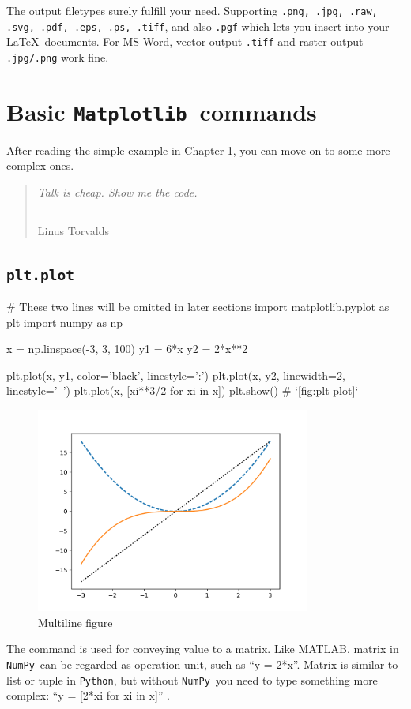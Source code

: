 \documentclass{report}
\newcommand{\pkg}[1]{\texttt{#1}}
\newcommand{\Py}{\pkg{Python}}
\newcommand{\NumPy}{\pkg{NumPy}}
\newcommand{\mpl}{\texttt{Matplotlib}}
\newcommand{\smallquote}[3][0.8ex]{\begin{quote}
    \flushright\emph{#2}\\[#1]
    \ttfamily\rule[0.5ex]{2em}{0.8pt} #3\end{quote}}
\begin{document}
The output filetypes surely fulfill your need. Supporting \texttt{.png, .jpg, .raw, .svg, .pdf, .eps, .ps, .tiff}, and also \texttt{.pgf} which lets you insert into your \LaTeX\ documents. For MS Word, vector output \texttt{.tiff} and raster output \texttt{.jpg/.png} work fine.

\chapter{Basic \mpl\ commands}
After reading the simple example in Chapter 1, you can move on to some more complex ones. 

\smallquote{Talk is cheap. Show me the code.}{Linus Torvalds}

\section{\texttt{plt.plot}}

\begin{py}
# These two lines will be omitted in later sections
import matplotlib.pyplot as plt
import numpy as np

x = np.linspace(-3, 3, 100)
y1 = 6*x
y2 = 2*x**2

plt.plot(x, y1, color='black', linestyle=':')
plt.plot(x, y2, linewidth=2, linestyle='--')
plt.plot(x, [xi**3/2 for xi in x])
plt.show() # `\autoref{fig:plt-plot}`
\end{py}

\begin{figure}[!htb]
  \centering
  \includegraphics[width=90mm]{plt-plot}
  \caption{Multiline figure}
  \label{fig:plt-plot}
\end{figure}

The command  is used for conveying value to a matrix. Like MATLAB, matrix in \NumPy\ can be regarded as operation unit, such as ``y = 2*x''. Matrix is similar to list or tuple in \Py , but without \NumPy\ you need to type something more complex: ``y = [2*xi for xi in x]'' .
\end{document}
